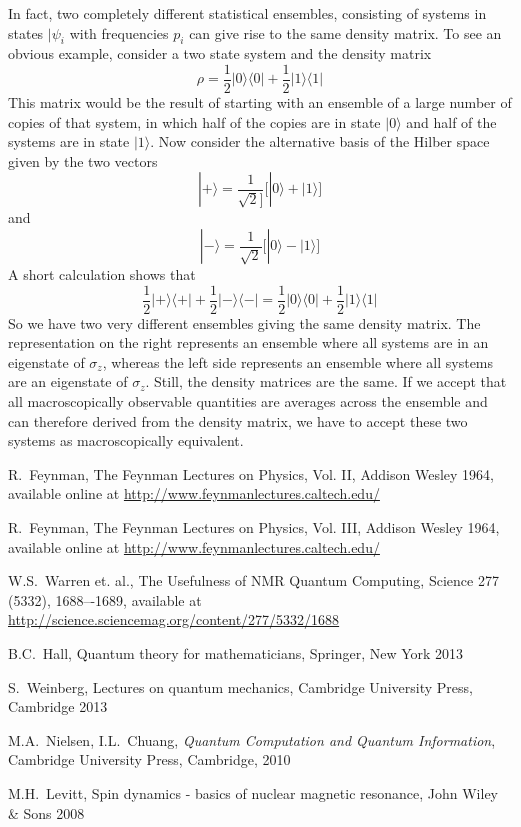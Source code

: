 \documentclass[a4paper, draft]{article}
\theoremstyle{own}
\theoremstyle{remark}
\begin{document}
In fact, two completely different statistical ensembles, consisting of systems in states $|\psi_i$ with frequencies $p_i$ can give rise to the same density matrix. To see an obvious example, consider a two state system and the density matrix
$$
\rho = \frac{1}{2} |0 \rangle \langle 0 | + \frac{1}{2} |1 \rangle \langle 1 |
$$
This matrix would be the result of starting with an ensemble of a large number of copies of that system, in which half of the copies are in state $|0 \rangle$ and half of the systems are in state $|1 \rangle$. Now consider the alternative basis of the Hilber space given by the two vectors
$$
|+ \rangle = \frac{1}{\sqrt{2}]}\big[ |0 \rangle + |1 \rangle \big] 
$$
and
$$
|- \rangle = \frac{1}{\sqrt{2}} \big[ |0 \rangle - |1 \rangle \big] 
$$
A short calculation shows that
$$
\frac{1}{2} | +\rangle \langle +| + \frac{1}{2} | -\rangle \langle -|
=
\frac{1}{2} |0 \rangle \langle 0 | + \frac{1}{2} |1 \rangle \langle 1 |
$$
So we have two very different ensembles giving the same density matrix. The representation on the right represents an ensemble where all systems are in an eigenstate of $\sigma_z$, whereas the left side represents an ensemble where all systems are an eigenstate of $\sigma_z$. Still, the density matrices are the same. If we accept that all macroscopically observable quantities are averages across the ensemble and can therefore derived from the density matrix, we have to accept these two systems as macroscopically equivalent. 

\begin{thebibliography}{9}


R.~Feynman,
The Feynman Lectures on Physics, Vol. II, Addison Wesley 1964, available online at \url{http://www.feynmanlectures.caltech.edu/}


R.~Feynman,
The Feynman Lectures on Physics, Vol. III, Addison Wesley 1964, available online at \url{http://www.feynmanlectures.caltech.edu/}


W.S.~Warren et. al., 
The Usefulness of NMR Quantum Computing, Science 277 (5332), 1688–-1689, available at \url{http://science.sciencemag.org/content/277/5332/1688}

B.C.~Hall, Quantum theory for mathematicians, Springer, New York 2013

S.~Weinberg, Lectures on quantum mechanics, Cambridge University Press, Cambridge 2013

M.A.~Nielsen, I.L.~Chuang, \emph{Quantum Computation and Quantum Information},
Cambridge University Press, Cambridge, 2010


M.H.~Levitt, Spin dynamics - basics of nuclear magnetic resonance, John Wiley \& Sons 2008

\end{thebibliography}
\end{document}
